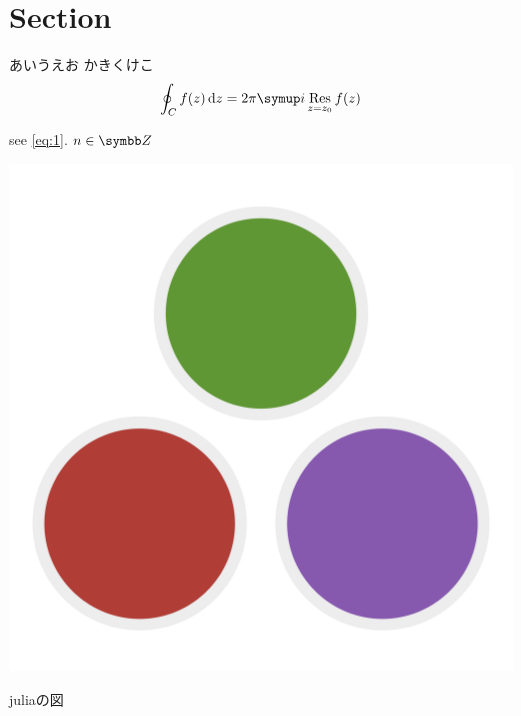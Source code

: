%

\pagestyle{fancy}%
\fancyhead[L]{\textsc{\rightmark}}%
\fancyhead[C]{}%
\fancyhead[R]{\thepage}%
\fancyfoot{}%


\usepackage{lipsum}


\section{Section}
あいうえお
かきくけこ
\begin{gather}%
  \label{eq:1}
  \oint_{C} f(z) \dl{z} = 2\pi \i \Res_{z = z_0} f(z)
\end{gather}%

\begin{tcolorbox}[solidbox]
  \lipsum[5-8]
\end{tcolorbox}
\begin{tcolorbox}[solidbox]
  \lipsum[1-4]
\end{tcolorbox}
see \eqref{eq:1}.
$n \in \Z$
\begin{wrapstuff}[type=figure,r,width=0.3\linewidth]
  \centering
  \includegraphics[width=0.9\linewidth]{pic/test.png}
  \caption{juliaの図}
\end{wrapstuff}
\lipsum[1-3]
%
